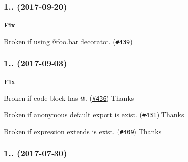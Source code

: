 \subsubsection*{1.. (2017-\/09-\/20)}


\begin{DoxyItemize}
\item {\bfseries Fix}
\begin{DoxyItemize}
\item Broken if using {\ttfamily @foo.\+bar} decorator. (\href{https://github.com/esdoc/esdoc/issues/439}{\tt \#439})
\end{DoxyItemize}
\end{DoxyItemize}

\subsubsection*{1.. (2017-\/09-\/03)}


\begin{DoxyItemize}
\item {\bfseries Fix}
\begin{DoxyItemize}
\item Broken if code block has {\ttfamily @}. (\href{https://github.com/esdoc/esdoc/pull/436}{\tt \#436}) Thanks \href{https://github.com/pzuraq}{\tt }
\item Broken if anonymous default export is exist. (\href{https://github.com/esdoc/esdoc/issues/431}{\tt \#431}) Thanks \href{https://github.com/zemzheng}{\tt }
\item Broken if expression extends is exist. (\href{https://github.com/esdoc/esdoc/pull/409}{\tt \#409}) Thanks \href{https://github.com/dimitryvolkov}{\tt }
\end{DoxyItemize}
\end{DoxyItemize}

\subsubsection*{1.. (2017-\/07-\/30)}


